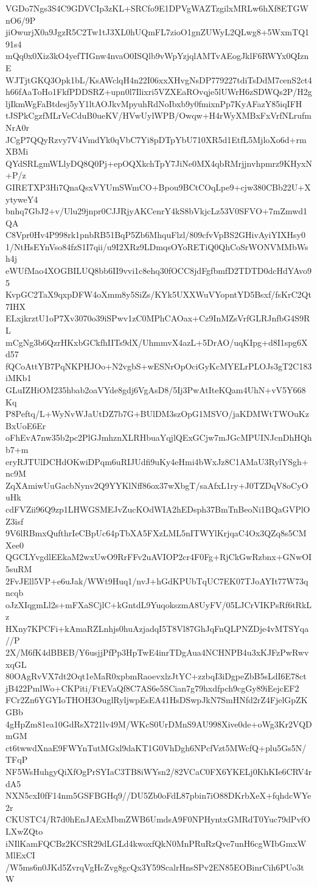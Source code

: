 VGDo7Ngs3S4C9GDVCIp3zKL+SRCfo9E1DPVgWAZTzgilxMRLw6hXf8ETGWnO6/9P
jiOwurjX0a9JgzR5C2Tw1tJ3XL0hUQmFL7zioO1gnZUWyL2QLwg8+5WxmTQ191s4
mQq0x0Xiz3kO4yefTIGnw4nvaO0ISQlb9vWpYzjqlAMTvAEogJklF6RWYx0QIznE
WJTjtGKQ3Opk1bL/KsAWclqH4n22I06xxXHvgNsDP779227tdiTsDdM7cenS2ct4
h66fAaToHo1FkfPDDSRZ+upn0l7Ilixri5VZXEaROvqje5lUWrH6zSDWQs2P/H2g
ljIkmWgFaBtdesj5yY1ltAOJkvMpyuhRdNoIbxb9y0fmixnPp7KyAFazY85iqIFH
tJSPkCgzfMLrVeCduB0ueKV/HVwUylWPB/Owqw+H4rWyXMBxFxVrfNLrufmNrA0r
JCgP7QQyRzvy7V4VmdYk0qVbC7Yi8pDTpYbU710XR5d1EtfL5MjloXo6d+rmXBMi
QYdSRLgmWLlyDQ8Q0Pj+epOQXkchTpY7JiNe0MX4qbRMrjjnvhpmrz9KHyxN+P/z
GIRETXP3Hi7QnaQsxVYUmSWmCO+Bpou9BCtCOqLpe9+cjw380CBb22U+XytyweY4
bnhq7GbJ2+v/Ulu29jnpr0CJJRjyAKCenrY4kS8bVkjcLz53V0SFVO+7mZmwd1QA
C8Vpr0Hv4P998rk1pnbRB51BqP5Zb6MhquFlzl/809cfvVpBS2GHivAyiYIXHsy0
1/NtHsEYnVso84fzS1I7qii/u9I2XRz9LDmqsOYoRETiQ0QhCoSrWONVMMbWsh4j
eWUfMao4XOGBILUQ8bb6II9vvi1c8ehq30fOCC8jdFgfbmfD2TDTD0dcHdYAvo95
KvpGC2TaX9qxpDFW4oXmm8y5SiZs/KYk5UXXWuVYopntYD5Bsxf/fsKrC2Qt7IHX
ELxjkrztU1oP7Xv3070o39iSPwv1zC0MPhCAOax+Cz9InMZsVrfGLRJnfbG4S9RL
mCgNg3b6QzrHKxbGCkfhIITs9dX/UhmmvX4azL+5DrAO/uqKIpg+d8I1spg6Xd57
fQCoAttYB7PqNKPHJOo+N2vgbS+wESNrOpOciGyKcMYELrPLOJs3gT2C183iMKb1
GLuIZHiOM235hbab2oaVYde8gdj6VgAsD8/5Ij3PwAtIteKQam4UhN+vV5Y668Kq
P8Peftq/L+WyNvWJaUtDZ7b7G+BUlDM3szOpG1MSVO/jaKDMWtTWOuKzBxUoE6Er
oFhEvA7nw35b2pc2PlGJmhznXLRHbuaYqjlQExGCjw7mJGcMPUINJcnDhHQhb7+m
eryRJTUlDCHdOKwiDPqm6uRIJUdfi9uKy4eHmi4bWxJz8C1AMaU3RylYSgh+nc9M
ZqXAmiwUuGacbNynv2Q9YYKlNff86ox37wXbgT/saAfxL1ry+J0TZDqV8oCyOuHk
cdFVZii96Q9zp1LHWGSMEJvZucKOdWIA2hEDsph37BmTnBeoNi1BQaGVPlOZ3isf
9V6lRBmxQufthrIeCBpUc64pTbXA5FXzLML5nITWYlKrjqaC4Ox3QZq8s5CMXee0
QGCLYvgdlEEkaM2wxUwO9RrFFv2uAVIOP2cr4F0Fg+RjCkGwRzbnx+GNwOI5suRM
2FvJEll5VP+e6uJak/WWt9Huq1/nvJ+hGdKPUbTqUC7EK07TJoAYIt77W73qncqb
oJzXIqgmLl2s+mFXaSCjlC+kGntdL9YuqokszmA8UyFV/05LJCrVIKPsRf6tRkLz
HXny7KPCFi+kAmaRZLnhjs0huAzjadqI5T8Vl87GhJqFnQLPNZDje4vMTSYqa//P
2X/M6fK4dBBEB/Y6usjjPfPp3HpTwE4inrTDgAua4NCHNPB4u3xKJFzPwRwvxqGL
80OAgRvVX7dt2Oqt1eMaR0xpbmRaoevxlzJtYC+zzbqI3iDgpeZbB5sLdI6E78ct
jB422PmlWo+CKPiti/FtEVaQf8C7AS6e5SCian7g79hxdfpch9cgGy89iEejcEF2
FCr2Zn6YGYIoTHOH3OuglRyljwpEsEA41HsDSwpJkN7SmHNfd2rZ4FjelGpZKGBb
4gHpZm81ea10GdRsX721lv49M/WKcS0UrDMnS9AU998Xive0de+oWg3Kr2VQDmGM
ct6twwdXnaE9FWYnTutMGxl9daKT1G0VhDgh6NPcfVzt5MWcfQ+plu5Gs5N/TFqP
NF5WsHuhgyQiXfOgPrSYIaC3TB8iWYsn2/82VCaC0FX6YKELj0KhKIe6CRV4rdA5
NXN5cxI0fF14nm5GSFBGHq9//DU5Zb0oFdL87pbin7iO88DKrbXeX+fqhdcWYe2r
CKUSTC4/R7d0hEnJAExMbmZWB6UmdsA9F0NPHyntxGMRdT0Yuc79dPvfOLXwZQto
iNIlKamFQCBz2KCSR29dLGLd4kwoxfQkN0MnPRuRzQve7unH6cgWIbGmxWMlExCI
/W5ms6n0JKd5ZvrqVgHcZvg8gcQx3Y59ScalrHnsSPv2EN85EOBinrCih6PUo3tW
